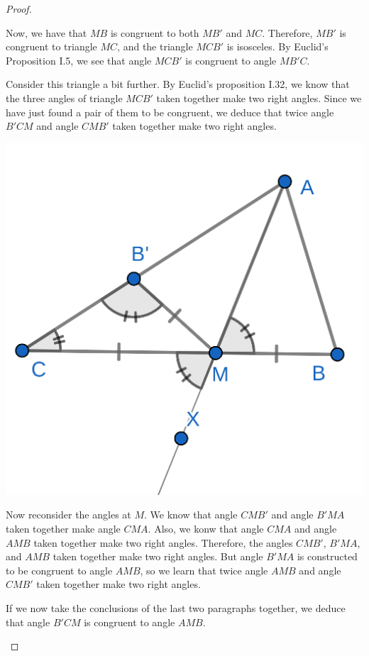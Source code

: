 \documentclass{tufte-handout}
\theoremstyle{definition}
\begin{document}
\begin{proof}
\begin{description}
Now, we have that $MB$ is congruent to both $MB'$ and $MC$. Therefore, $MB'$ is congruent to triangle $MC$, and the triangle $MCB'$ is isosceles. By Euclid's Proposition I.5, we see that angle $MCB'$ is congruent to angle $MB'C$.

Consider this triangle a bit further. By Euclid's proposition I.32, we know that the three angles of triangle $MCB'$ taken together make two right angles. Since we have just found a pair of them to be congruent, we deduce that twice angle $B'CM$ and angle $CMB'$ taken together make two right angles.

\begin{marginfigure}
  \includegraphics{images/iso_5.png}
\end{marginfigure}

Now reconsider the angles at $M$. We know that angle $CMB'$ and angle $B'MA$ taken together make angle $CMA$. Also, we konw that angle $CMA$ and angle $AMB$ taken together make two right angles. Therefore, the angles $CMB'$, $B'MA$, and $AMB$ taken together make two right angles. But angle $B'MA$ is constructed to be congruent to angle $AMB$, so we learn that
twice angle $AMB$ and angle $CMB'$ taken together make two right angles.

If we now take the conclusions of the last two paragraphs together, we deduce that angle $B'CM$ is congruent to angle $AMB$.




\end{description}
\end{proof}
\end{document}
